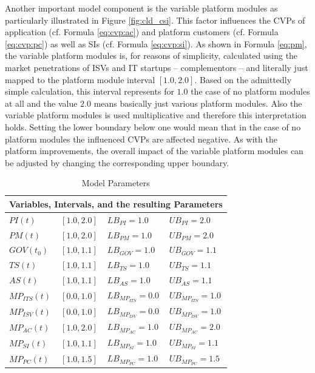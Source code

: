 Another important model component is the variable platform modules as particularly illustrated in Figure \ref{fig:cld_csi}. This factor influences the \acp{CVP} of application (cf. Formula \ref{eq:cvp:ac}) and platform customers (cf. Formula \ref{eq:cvp:pc}) as well as \acp{SI} (cf. Formula \ref{eq:cvp:si}). As shown in Formula \ref{eq:pm}, the variable platform modules is, for reasons of simplicity, calculated using the market penetrations of \acp{ISV} and \ac{IT} startups -- complementors -- and literally just mapped to the platform module interval $[1.0,2.0]$. Based on the admittedly simple calculation, this interval represents for $1.0$ the case of no platform modules at all and the value $2.0$ means basically just various platform modules. Also the variable platform modules is used multiplicative and therefore this interpretation holds. Setting the lower boundary below one would mean that in the case of no platform modules the influenced \acp{CVP} are affected negative. As with the platform improvements, the overall impact of the variable platform modules can be adjusted by changing the corresponding upper boundary.

\begin{table}[t]
	\centering
	\begin{tabular}{llll}
			\toprule 
			\multicolumn{4}{c}{\footnotesize \textbf{Variables, Intervals, and the resulting Parameters}}\\ \midrule
			\footnotesize $PI(t)$ & \footnotesize $[1.0,2.0]$ & \footnotesize $LB_{PI} = 1.0$ & \footnotesize $UB_{PI} = 2.0$ \\ 
			\footnotesize $PM(t)$ & \footnotesize  $[1.0,2.0]$ & \footnotesize $LB_{PM} = 1.0$ & \footnotesize $UB_{PM} = 2.0$ \\ \midrule
			\footnotesize $GOV(t_0)$ & \footnotesize $[1.0,1.1]$ & \footnotesize $LB_{GOV} = 1.0$ & \footnotesize $UB_{GOV} = 1.1$ \\
			\footnotesize $TS(t)$ & \footnotesize $[1.0,1.1]$ & \footnotesize $LB_{TS} = 1.0$ & \footnotesize $UB_{TS} = 1.1$ \\
			\footnotesize $AS(t)$ & \footnotesize $[1.0,1.1]$ & \footnotesize $LB_{AS} = 1.0$ & \footnotesize $UB_{AS} = 1.1$ \\ \midrule
			\footnotesize $MP_{ITS}(t)$ & \footnotesize $[0.0,1.0]$ & \footnotesize $LB_{MP_{ITS}} = 0.0$ & \footnotesize $UB_{MP_{ITS}} = 1.0$ \\
			\footnotesize $MP_{ISV}(t)$ & \footnotesize $[0.0,1.0]$ & \footnotesize $LB_{MP_{ISV}} = 0.0$ & \footnotesize $UB_{MP_{ISV}} = 1.0$ \\
			\footnotesize $MP_{AC}(t)$ & \footnotesize $[1.0,2.0]$ & \footnotesize $LB_{MP_{AC}} = 1.0$ & \footnotesize $UB_{MP_{AC}} = 2.0$ \\
			\footnotesize $MP_{SI}(t)$ & \footnotesize $[1.0,1.1]$ & \footnotesize $LB_{MP_{SI}} = 1.0$ & \footnotesize $UB_{MP_{SI}} = 1.1$ \\
			\footnotesize $MP_{PC}(t)$ & \footnotesize $[1.0,1.5]$ & \footnotesize $LB_{MP_{PC}} = 1.0$ & \footnotesize $UB_{MP_{PC}} = 1.5$ \\ \bottomrule
	\end{tabular}
	\caption{Model Parameters}
	\label{tab:mpara}
\end{table}

